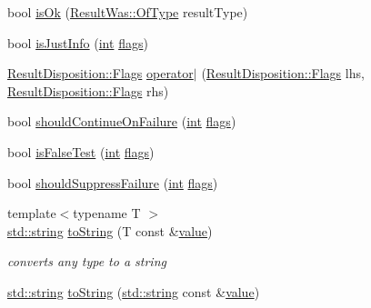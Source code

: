 \begin{DoxyCompactItemize}
\item 
bool \hyperlink{namespace_catch_a5205869c81c06d3460759cb86676ae68}{is\+Ok} (\hyperlink{struct_catch_1_1_result_was_a624e1ee3661fcf6094ceef1f654601ef}{Result\+Was\+::\+Of\+Type} result\+Type)
\item 
bool \hyperlink{namespace_catch_a54b01af61673a3e1f21f31713639b180}{is\+Just\+Info} (\hyperlink{_s_d_l__thread_8h_a6a64f9be4433e4de6e2f2f548cf3c08e}{int} \hyperlink{_s_d_l__opengl__glext_8h_ac7ba7d3cce3d19ca020e056b37231289}{flags})
\item 
\hyperlink{struct_catch_1_1_result_disposition_a3396cad6e2259af326b3aae93e23e9d8}{Result\+Disposition\+::\+Flags} \hyperlink{namespace_catch_ab32a083e442cc09f736327d2e2865999}{operator$\vert$} (\hyperlink{struct_catch_1_1_result_disposition_a3396cad6e2259af326b3aae93e23e9d8}{Result\+Disposition\+::\+Flags} lhs, \hyperlink{struct_catch_1_1_result_disposition_a3396cad6e2259af326b3aae93e23e9d8}{Result\+Disposition\+::\+Flags} rhs)
\item 
bool \hyperlink{namespace_catch_a7f7480b15d74965459c844f0d393ed87}{should\+Continue\+On\+Failure} (\hyperlink{_s_d_l__thread_8h_a6a64f9be4433e4de6e2f2f548cf3c08e}{int} \hyperlink{_s_d_l__opengl__glext_8h_ac7ba7d3cce3d19ca020e056b37231289}{flags})
\item 
bool \hyperlink{namespace_catch_a93ef4e3e307a2021ca0d41b32c0e54b0}{is\+False\+Test} (\hyperlink{_s_d_l__thread_8h_a6a64f9be4433e4de6e2f2f548cf3c08e}{int} \hyperlink{_s_d_l__opengl__glext_8h_ac7ba7d3cce3d19ca020e056b37231289}{flags})
\item 
bool \hyperlink{namespace_catch_ab91eb13081203d634fe48d3d2ab386d7}{should\+Suppress\+Failure} (\hyperlink{_s_d_l__thread_8h_a6a64f9be4433e4de6e2f2f548cf3c08e}{int} \hyperlink{_s_d_l__opengl__glext_8h_ac7ba7d3cce3d19ca020e056b37231289}{flags})
\item 
{\footnotesize template$<$typename T $>$ }\\\hyperlink{_s_d_l__opengl__glext_8h_ae84541b4f3d8e1ea24ec0f466a8c568b}{std\+::string} \hyperlink{namespace_catch_a386cb19a84b12339486771ad143a95ae}{to\+String} (T const \&\hyperlink{_s_d_l__opengl__glext_8h_a8ad81492d410ff2ac11f754f4042150f}{value})
\begin{DoxyCompactList}\small\item\em converts any type to a string \end{DoxyCompactList}\item 
\hyperlink{_s_d_l__opengl__glext_8h_ae84541b4f3d8e1ea24ec0f466a8c568b}{std\+::string} \hyperlink{namespace_catch_ad6e969257437cf007b8b5017b22e570c}{to\+String} (\hyperlink{_s_d_l__opengl__glext_8h_ae84541b4f3d8e1ea24ec0f466a8c568b}{std\+::string} const \&\hyperlink{_s_d_l__opengl__glext_8h_a8ad81492d410ff2ac11f754f4042150f}{value})

\end{DoxyCompactItemize}
